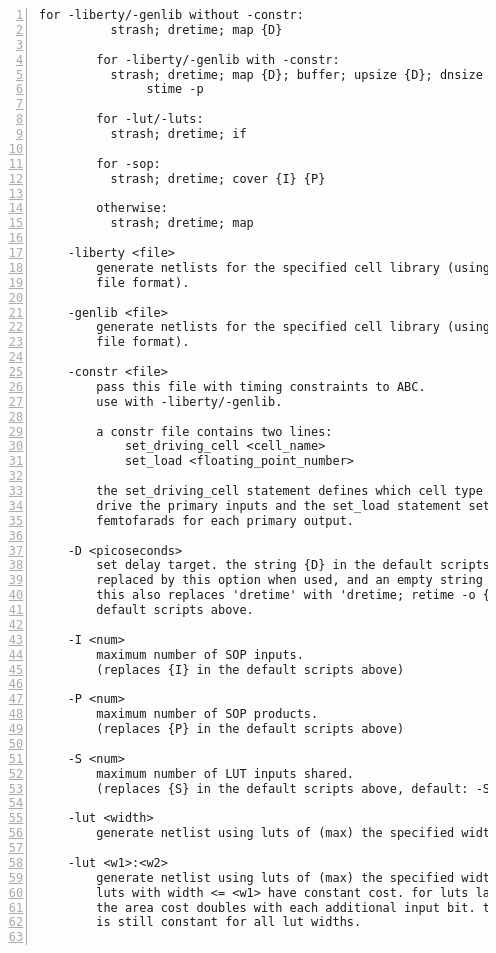 \begin{lstlisting}[numbers=left,frame=single]
        for -liberty/-genlib without -constr:
          strash; dretime; map {D}

        for -liberty/-genlib with -constr:
          strash; dretime; map {D}; buffer; upsize {D}; dnsize {D};
               stime -p

        for -lut/-luts:
          strash; dretime; if

        for -sop:
          strash; dretime; cover {I} {P}

        otherwise:
          strash; dretime; map

    -liberty <file>
        generate netlists for the specified cell library (using the liberty
        file format).

    -genlib <file>
        generate netlists for the specified cell library (using the SIS Genlib
        file format).

    -constr <file>
        pass this file with timing constraints to ABC.
        use with -liberty/-genlib.

        a constr file contains two lines:
            set_driving_cell <cell_name>
            set_load <floating_point_number>

        the set_driving_cell statement defines which cell type is assumed to
        drive the primary inputs and the set_load statement sets the load in
        femtofarads for each primary output.

    -D <picoseconds>
        set delay target. the string {D} in the default scripts above is
        replaced by this option when used, and an empty string otherwise.
        this also replaces 'dretime' with 'dretime; retime -o {D}' in the
        default scripts above.

    -I <num>
        maximum number of SOP inputs.
        (replaces {I} in the default scripts above)

    -P <num>
        maximum number of SOP products.
        (replaces {P} in the default scripts above)

    -S <num>
        maximum number of LUT inputs shared.
        (replaces {S} in the default scripts above, default: -S 1)

    -lut <width>
        generate netlist using luts of (max) the specified width.

    -lut <w1>:<w2>
        generate netlist using luts of (max) the specified width <w2>. All
        luts with width <= <w1> have constant cost. for luts larger than <w1>
        the area cost doubles with each additional input bit. the delay cost
        is still constant for all lut widths.


\end{lstlisting}
